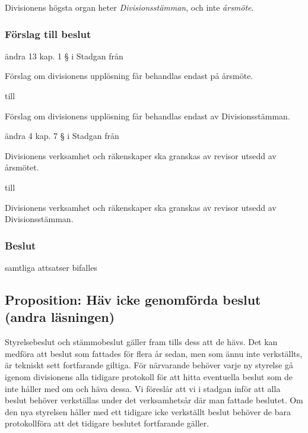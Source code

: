 \documentclass[protokoll]{dvd}
\begin{document}
Divisionens högsta organ heter \emph{Divisionsstämman}, och inte \emph{årsmöte}.

\subsubsection*{Förslag till beslut}

\begin{attsatser}
	\item ändra 13 kap. 1 § i Stadgan från

	\begin{displayquote}
        Förslag om divisionens upplösning får behandlas endast på årsmöte.
    \end{displayquote}

	till

	\begin{displayquote}
		Förslag om divisionens upplösning får behandlas endast av Divisionsstämman.
	\end{displayquote}

	\item ändra 4 kap. 7 § i Stadgan från

	\begin{displayquote}
        Divisionens verksamhet och räkenskaper ska granskas av revisor utsedd av årsmötet.
    \end{displayquote}

	till

	\begin{displayquote}
		Divisionens verksamhet och räkenskaper ska granskas av revisor utsedd av Divisionsstämman.
	\end{displayquote}
\end{attsatser}

\subsubsection*{Beslut}
    \begin{attsatser}
        \item samtliga attsatser bifalles
    \end{attsatser}

\newpage
\subsection{Proposition: Häv icke genomförda beslut (andra läsningen)}

Styrelsebeslut och stämmobeslut gäller fram tills dess att de hävs.
Det kan medföra att beslut som fattades för flera år sedan, men som ännu inte verkställts, är tekniskt sett fortfarande giltiga.
För närvarande behöver varje ny styrelse gå igenom divisionens alla tidigare protokoll för att hitta eventuella beslut som de inte håller med om och häva dessa.
Vi föreslår att vi i stadgan inför att alla beslut behöver verkställas under det verksamhetsår där man fattade beslutet.
Om den nya styrelsen håller med ett tidigare icke verkställt beslut behöver de bara protokollföra att det tidigare beslutet fortfarande gäller.
\end{document}
